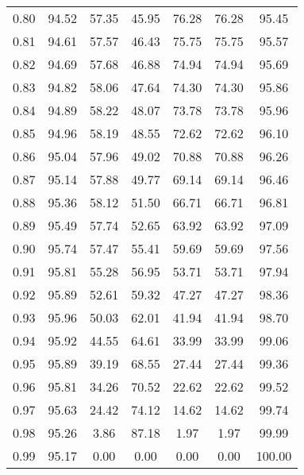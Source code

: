\begin{tabular}{|c|c|c|c|c|c|c|}
      0.80 &     94.52 &     57.35 &      45.95 &   76.28 &      76.28 &         95.45 \\
      0.81 &     94.61 &     57.57 &      46.43 &   75.75 &      75.75 &         95.57 \\
      0.82 &     94.69 &     57.68 &      46.88 &   74.94 &      74.94 &         95.69 \\
      0.83 &     94.82 &     58.06 &      47.64 &   74.30 &      74.30 &         95.86 \\
      0.84 &     94.89 &     58.22 &      48.07 &   73.78 &      73.78 &         95.96 \\
      0.85 &     94.96 &     58.19 &      48.55 &   72.62 &      72.62 &         96.10 \\
      0.86 &     95.04 &     57.96 &      49.02 &   70.88 &      70.88 &         96.26 \\
      0.87 &     95.14 &     57.88 &      49.77 &   69.14 &      69.14 &         96.46 \\
      0.88 &     95.36 &     58.12 &      51.50 &   66.71 &      66.71 &         96.81 \\
      0.89 &     95.49 &     57.74 &      52.65 &   63.92 &      63.92 &         97.09 \\
      0.90 &     95.74 &     57.47 &      55.41 &   59.69 &      59.69 &         97.56 \\
      0.91 &     95.81 &     55.28 &      56.95 &   53.71 &      53.71 &         97.94 \\
      0.92 &     95.89 &     52.61 &      59.32 &   47.27 &      47.27 &         98.36 \\
      0.93 &     95.96 &     50.03 &      62.01 &   41.94 &      41.94 &         98.70 \\
      0.94 &     95.92 &     44.55 &      64.61 &   33.99 &      33.99 &         99.06 \\
      0.95 &     95.89 &     39.19 &      68.55 &   27.44 &      27.44 &         99.36 \\
      0.96 &     95.81 &     34.26 &      70.52 &   22.62 &      22.62 &         99.52 \\
      0.97 &     95.63 &     24.42 &      74.12 &   14.62 &      14.62 &         99.74 \\
      0.98 &     95.26 &      3.86 &      87.18 &    1.97 &       1.97 &         99.99 \\
      0.99 &     95.17 &      0.00 &       0.00 &    0.00 &       0.00 &        100.00 \\
\bottomrule
\end{tabular}

